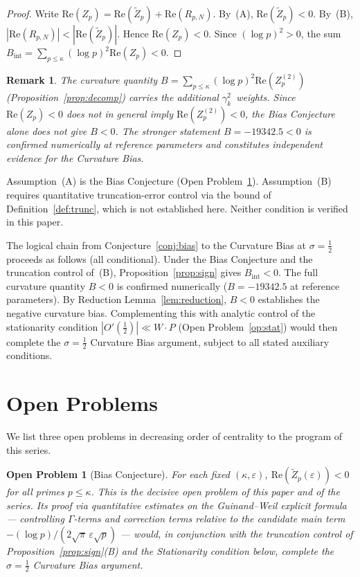 \documentclass[11pt]{article}
\newtheorem*{remark}{Remark}
\newtheorem{openproblem}[theorem]{Open Problem}
\newcommand{\Zt}{\widetilde{Z}}
\begin{document}
\begin{proof}
Write $\mathrm{Re}(Z_p) = \mathrm{Re}(\Zt_p) + \mathrm{Re}(R_{p,N})$.
By~(A), $\mathrm{Re}(\Zt_p)<0$.
By~(B), $|\mathrm{Re}(R_{p,N})|<|\mathrm{Re}(\Zt_p)|$.
Hence $\mathrm{Re}(Z_p)<0$.
Since $(\log p)^2>0$, the sum
$B_{\mathrm{int}}=\sum_{p\leq\kappa}(\log p)^2\mathrm{Re}(Z_p)<0$.
\end{proof}

\begin{remark}
The curvature quantity $B=\sum_{p\leq\kappa}(\log p)^2\mathrm{Re}(Z_p^{(2)})$
(Proposition~\ref{prop:decomp}) carries the additional $\gamma_k^2$~weights.
Since $\mathrm{Re}(Z_p)<0$ does not in general imply
$\mathrm{Re}(Z_p^{(2)})<0$, the Bias Conjecture alone does not give $B<0$.
The stronger statement $B=-19342.5<0$ is confirmed numerically at reference
parameters and constitutes independent evidence for the Curvature Bias.
\end{remark}

Assumption~(A) is the Bias Conjecture (Open Problem~\ref{op:bias}).
Assumption~(B) requires quantitative truncation-error control via
the bound of Definition~\ref{def:trunc}, which is not established here.
Neither condition is verified in this paper.

The logical chain from Conjecture~\ref{conj:bias} to the Curvature Bias
at $\sigma=\tfrac{1}{2}$ proceeds as follows (all conditional).
Under the Bias Conjecture and the truncation control of~(B),
Proposition~\ref{prop:sign} gives $B_{\mathrm{int}}<0$.
The full curvature quantity $B<0$ is confirmed numerically
($B=-19342.5$ at reference parameters).
By Reduction Lemma~\ref{lem:reduction}, $B<0$ establishes the
negative curvature bias.
Complementing this with analytic control of the stationarity condition
$|O'(\tfrac{1}{2})|\ll W\cdot P$ (Open Problem~\ref{op:stat})
would then complete the $\sigma=\tfrac{1}{2}$ Curvature Bias argument,
subject to all stated auxiliary conditions.

\section{Open Problems}
\label{sec:open}

We list three open problems in decreasing order of centrality
to the program of this series.

\begin{openproblem}[Bias Conjecture]\label{op:bias}
\label{op:bias}
For each fixed $(\kappa,\varepsilon)$,
$\mathrm{Re}(\Zt_p(\varepsilon))<0$ for all primes $p\leq\kappa$.
This is the decisive open problem of this paper and of the series.
Its proof via quantitative estimates on the Guinand--Weil explicit
formula --- controlling $\Gamma$-terms and correction terms relative
to the candidate main term $-(\log p)/(2\sqrt{\pi}\,\varepsilon\sqrt{p})$
--- would, in conjunction with the truncation control of
Proposition~\ref{prop:sign}(B) and the Stationarity condition below,
complete the $\sigma=\tfrac{1}{2}$ Curvature Bias argument.
\end{openproblem}
\end{document}
